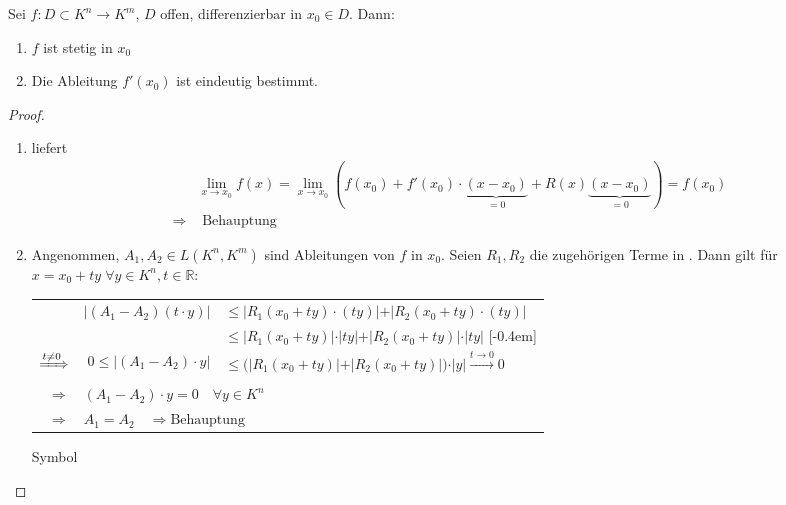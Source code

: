 \begin{proposition}
	Sei $f:D\subset K^n \to K^m$, $D$ offen, differenzierbar in $x_0\in D$. Dann:
	\begin{enumerate}[label={\arabic*)}]
		\item $f$ ist stetig in $x_0$
		\item Die Ableitung $f'(x_0)$ ist eindeutig bestimmt.
	\end{enumerate}
\end{proposition}

\begin{proof}
	\NoEndMark \hspace*{0pt}
	\begin{enumerate}[label={zu \arabic*)},topsep=-5pt,leftmargin=\widthof{\ zu\ a)\ :\ }]
		\item {} liefert \begin{align*}
			& \lim\limits_{x\to x_0} f(x) = \lim\limits_{x\to x_0} \left( f(x_0) + f'(x_0) \cdot \underbrace{(x - x_0)}_{=0} + R(x) \underbrace{(x - x_0)}_{=0} \right) = f(x_0) \\
			\Rightarrow & \text{ Behauptung}
		\end{align*}
		\item Angenommen, $A_1, A_2\in L(K^n, K^m)$ sind Ableitungen von $f$ in $x_0$. Seien $R_1, R_2$ die zugehörigen Terme in . Dann gilt für $x=x_0 + ty \;\forall y\in K^n, t\in \mathbb{R}$:
		\vspace*{2mm} \ \\
		\renewcommand{\arraystretch}{1.2}
		\begin{tabularx}{\linewidth}{r@{\ \ }r@{\ }X}
			& $\vert (A_1 - A_2)(t\cdot y)\vert$ & $\le \vert R_1(x_0 + ty) \cdot (t y)\vert + \vert R_2(x_0 + ty) \cdot (ty) \vert$ \\
			& & $\le \vert R_1(x_0 + ty)\vert \cdot \vert ty \vert + \vert R_2(x_0 + ty)\vert \cdot \vert ty\vert$ \marginnote{$\left|  \cdot \frac{1}{\vert t \vert}\right.$}[-0.4em]\\
			$\xRightarrow{t \neq 0}$ &  $0 \le \vert (A_1 - A_2) \cdot y\vert$ & $\le \big( \vert R_1(x_0 + ty) \vert + \vert R_2(x_0 + t y)\vert \big) \cdot \vert y \vert \xrightarrow{t\to 0} 0$ \\
			$\Rightarrow$ & \multicolumn{2}{l}{$(A_1 - A_2) \cdot y = 0 \quad \forall y\in K^n$} \\
			$\Rightarrow$ & \multicolumn{2}{l}{$A_1 = A_2 \quad \Rightarrow \text{Behauptung}$ }
		\end{tabularx}
		
		\hfill\csname\InTheoType Symbol\endcsname
	\end{enumerate}
\end{proof}

